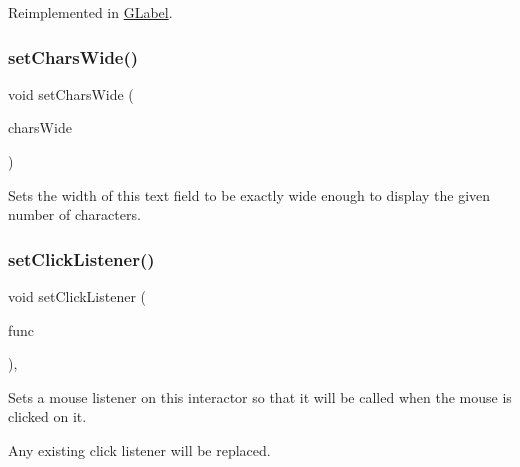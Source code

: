 Reimplemented in \mbox{\hyperlink{classGLabel_adb836652705fdc4b7e90b7a3afc56a37}{G\+Label}}.

\mbox{\label{classGTextField_aef8026e0b00b17dbccfc456e75308f16}} 
\subsubsection{\texorpdfstring{set\+Chars\+Wide()}{setCharsWide()}}
{\footnotesize\ttfamily void set\+Chars\+Wide (\begin{DoxyParamCaption}\item[{int}]{chars\+Wide }\end{DoxyParamCaption})\hspace{0.3cm}{\ttfamily [virtual]}}



Sets the width of this text field to be exactly wide enough to display the given number of characters. 

\mbox{\label{classGInteractor_abd40af6921242584d0954f173911b190}} 
\subsubsection{\texorpdfstring{set\+Click\+Listener()}{setClickListener()}\hspace{0.1cm}{\footnotesize\ttfamily [1/2]}}
{\footnotesize\ttfamily void set\+Click\+Listener (\begin{DoxyParamCaption}\item[{G\+Event\+Listener}]{func }\end{DoxyParamCaption})\hspace{0.3cm}{\ttfamily [virtual]}, {\ttfamily [inherited]}}



Sets a mouse listener on this interactor so that it will be called when the mouse is clicked on it. 

Any existing click listener will be replaced. \mbox{\label{classGInteractor_a856414c92df90f56f3877475eb3f8fc4}} 
